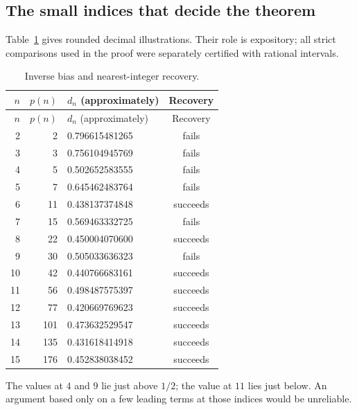 \documentclass[11pt]{article}
\numberwithin{equation}{section}
\theoremstyle{definition}
\theoremstyle{remark}
\begin{document}
\subsection{The small indices that decide the theorem}
Table~\ref{tab:bias} gives rounded decimal illustrations. Their role is
expository; all strict comparisons used in the proof were separately
certified with rational intervals.
\begin{center}
\begin{longtable}{@{}r r l c@{}}
\caption{Inverse bias and nearest-integer recovery.}\label{tab:bias}\\
\toprule
$n$ & $p(n)$ & $d_n$ (approximately) & Recovery\\
\midrule
\endfirsthead
\toprule
$n$ & $p(n)$ & $d_n$ (approximately) & Recovery\\
\midrule
\endhead
2 & 2 & 0.796615481265 & fails\\
3 & 3 & 0.756104945769 & fails\\
4 & 5 & 0.502652583555 & fails\\
5 & 7 & 0.645462483764 & fails\\
6 & 11 & 0.438137374848 & succeeds\\
7 & 15 & 0.569463332725 & fails\\
8 & 22 & 0.450004070600 & succeeds\\
9 & 30 & 0.505033636323 & fails\\
10 & 42 & 0.440766683161 & succeeds\\
11 & 56 & 0.498487575397 & succeeds\\
12 & 77 & 0.420669769623 & succeeds\\
13 & 101 & 0.473632529547 & succeeds\\
14 & 135 & 0.431618414918 & succeeds\\
15 & 176 & 0.452838038452 & succeeds\\
\bottomrule
\end{longtable}
\end{center}
The values at $4$ and $9$ lie just above $1/2$; the value at $11$ lies
just below. An argument based only on a few leading terms at those
indices would be unreliable.
\end{document}
